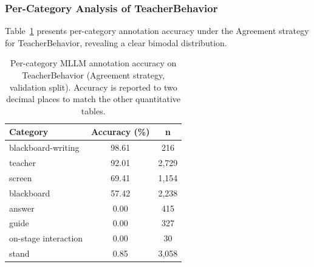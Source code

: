 \documentclass[10pt,letterpaper]{article}
\begin{document}
\subsubsection*{Per-Category Analysis of TeacherBehavior}

Table~\ref{tab:per_class} presents per-category annotation accuracy
under the Agreement strategy for TeacherBehavior, revealing a
clear bimodal distribution.

\begin{table}[H]
\caption{Per-category MLLM annotation accuracy on TeacherBehavior
(Agreement strategy, validation split). Accuracy is reported to two
decimal places to match the other quantitative tables.}
\label{tab:per_class}
\centering
\begin{tabular}{lcc}
\toprule
\textbf{Category} & \textbf{Accuracy (\%)} & \textbf{n} \\
\midrule
blackboard-writing  & 98.61 & 216  \\
teacher             & 92.01 & 2{,}729 \\
screen              & 69.41 & 1{,}154 \\
blackboard          & 57.42 & 2{,}238 \\
\midrule
answer              &  0.00 & 415  \\
guide               &  0.00 & 327  \\
on-stage interaction &  0.00 & 30   \\
stand               &  0.85 & 3{,}058 \\
\bottomrule
\end{tabular}
\end{table}
\end{document}
